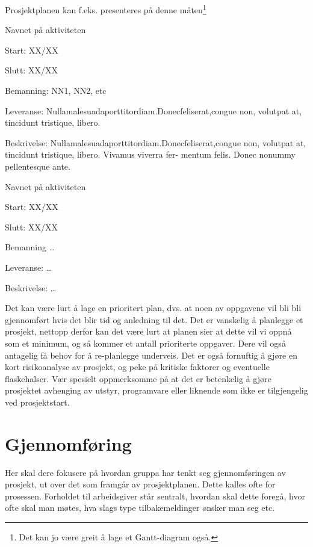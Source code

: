 \documentclass[11pt,a4paper]{report}
\begin{document}
Prosjektplanen kan f.eks. presenteres på denne måten\footnote{Det kan jo være greit å lage et Gantt-diagram også.}

\begin{compactdesc}
\item [Aktivitetet 1:] Navnet på aktiviteten
	\begin{compactitem}
	\item Start: XX/XX
	\item Slutt: XX/XX
	\item Bemanning: NN1, NN2, etc
	\item Leveranse: Nullamalesuadaporttitordiam.Donecfeliserat,congue
non, volutpat at, tincidunt tristique, libero. 
	\item Beskrivelse: Nullamalesuadaporttitordiam.Donecfeliserat,congue
non, volutpat at, tincidunt tristique, libero. Vivamus viverra fer- mentum felis. Donec nonummy pellentesque ante. 
	\end{compactitem}
	\item [Aktivitetet X:.] Navnet på aktiviteten
	\begin{compactitem}
	\item Start: XX/XX
	\item Slutt: XX/XX
	\item Bemanning \dots
	\item Leveranse: \dots
	\item Beskrivelse: \dots
	\end{compactitem}

\end{compactdesc}


Det kan være lurt å lage en prioritert plan, dvs. at noen av oppgavene vil bli bli gjennomført hvis det blir tid og anledning til det. Det er vanskelig å planlegge et prosjekt, nettopp derfor kan det være lurt at planen sier at dette vil vi oppnå som et minimum, og så kommer et antall prioriterte oppgaver. Dere vil også antagelig få behov for å re-planlegge underveis.  Det er også fornuftig å gjøre en kort risikoanalyse av prosjekt, og peke på kritiske faktorer og eventuelle flaskehalser. Vær spesielt oppmerksomme på at det er betenkelig å gjøre prosjektet avhenging av utstyr, programvare eller liknende som ikke er tilgjengelig ved prosjektstart.

\section*{Gjennomføring}

Her skal dere  fokusere på hvordan gruppa har tenkt seg gjennomføringen av prosjekt, ut over det som framgår av prosjektplanen. Dette kalles ofte for prosessen. Forholdet til arbeidsgiver står sentralt, hvordan skal dette foregå, hvor ofte skal man møtes, hva slags type tilbakemeldinger ønsker man seg etc.
\end{document}
